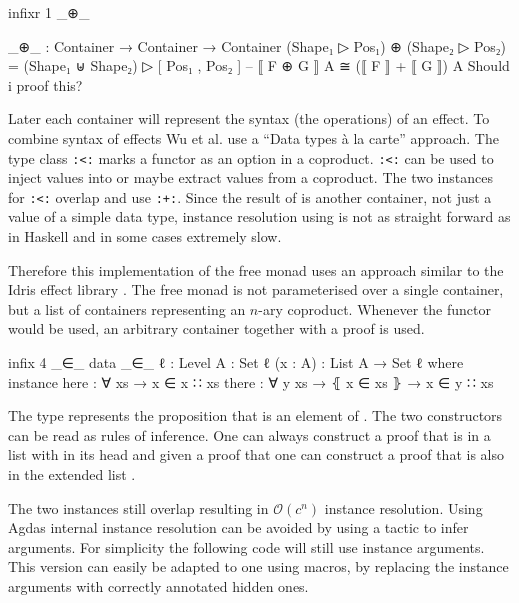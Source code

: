 \begin{code}[hide]
infixr 1 _⊕_
\end{code}
\begin{code}
_⊕_ : Container → Container → Container
(Shape₁ ▷ Pos₁) ⊕ (Shape₂ ▷ Pos₂) = (Shape₁ ⊎ Shape₂) ▷ [ Pos₁ , Pos₂ ]
-- ⟦ F ⊕ G ⟧ A ≅ (⟦ F ⟧ + ⟦ G ⟧) A         Should i proof this?
\end{code}
Later each container will represent the syntax (the operations) of an effect.
To combine syntax of effects Wu et al. use a ``Data types {\`{a}} la
carte''\cite{DBLP:journals/jfp/Swierstra08} approach.
The type class \texttt{:<:} marks a functor as an option in a coproduct.
\texttt{:<:} can be used to inject values into or maybe extract values from a
coproduct.
The two instances for \texttt{:<:} overlap and use \texttt{:+:}.
Since the result of  is another container, not just a
value of a simple data type, instance resolution using  is
not as straight forward as in Haskell and in some cases extremely slow.

Therefore this implementation of the free monad uses an approach similar to the
Idris effect library \cite{DBLP:conf/icfp/Brady13}.
The free monad is not parameterised over a single container, but a list
 of containers representing an $n$-ary coproduct.
Whenever the functor would be  used, an arbitrary container 
together with a proof
\AgdaSpace{}\AgdaSpace{} is
used.

\begin{code}
infix 4 _∈_
data _∈_ {ℓ : Level} {A : Set ℓ} (x : A) : List A → Set ℓ where
  instance
    here : ∀ {xs} → x ∈ x ∷ xs
    there : ∀ {y xs} → ⦃ x ∈ xs ⦄ → x ∈ y ∷ xs
\end{code}
The type
\AgdaSpace{}\AgdaSpace{}
represents the proposition that  is an element of
.
The two constructors can be read as rules of inference.
One can always construct a proof that  is in a list with
 in its head and given a proof that
\AgdaSpace{}\AgdaSpace{}
one can construct a proof that  is also in the extended list
\AgdaSpace{}\AgdaSpace{}.

The two instances still overlap resulting in $\mathcal{O}(c^n)$ instance
resolution.
Using Agdas internal instance resolution can be avoided by using a tactic to
infer  arguments.
For simplicity the following code will still use instance arguments.
This version can easily be adapted to one using macros, by replacing the
instance arguments with correctly annotated hidden ones.

